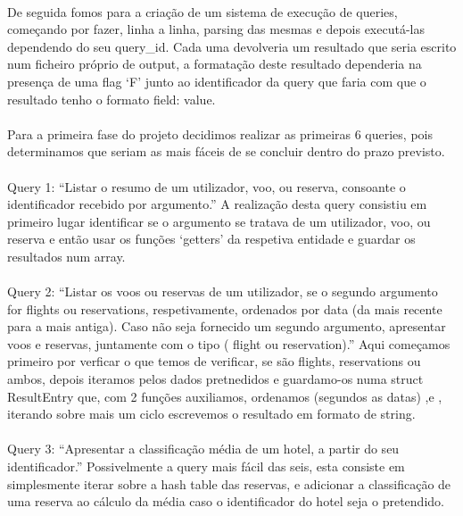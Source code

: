 \documentclass{article}
\begin{document}
\paragraph{}De seguida fomos para a criação de um sistema de execução de queries, começando por fazer, linha a linha, parsing das mesmas e depois executá-las dependendo do seu query\_id. Cada uma devolveria um resultado que seria escrito num ficheiro próprio de output, a formatação deste resultado dependeria na presença de uma flag ‘F’ junto ao identificador da query que faria com que o resultado tenho o formato field: value. 
\paragraph{}Para a primeira fase do projeto decidimos realizar as primeiras 6 queries, pois determinamos que seriam as mais fáceis de se concluir dentro do prazo previsto. 
\paragraph{}Query 1: “Listar o resumo de um utilizador, voo, ou reserva, consoante o identificador recebido por argumento.” A realização desta query consistiu em primeiro lugar identificar se o argumento se tratava de um utilizador, voo, ou reserva e então usar os funções ‘getters’ da respetiva entidade e guardar os resultados num array. 
\paragraph{}Query 2: “Listar os voos ou reservas de um utilizador, se o segundo argumento for flights ou reservations, respetivamente, ordenados por data (da mais recente para a mais antiga). Caso não seja fornecido um segundo argumento, apresentar voos e reservas, juntamente com o tipo ( flight ou reservation).”  Aqui começamos primeiro por verficar o que temos de verificar, se são flights, reservations ou ambos, depois iteramos pelos dados pretnedidos e guardamo-os numa struct ResultEntry que, com 2 funções auxiliamos, ordenamos (segundos as datas) ,e , iterando sobre mais um ciclo escrevemos o resultado em formato de string. 
\paragraph{}Query 3: “Apresentar a classificação média de um hotel, a partir do seu identificador.” Possivelmente a query mais fácil das seis, esta consiste em simplesmente iterar sobre a hash table das reservas, e adicionar a classificação de uma reserva ao cálculo da média caso o identificador do hotel seja o pretendido. 
\end{document}
